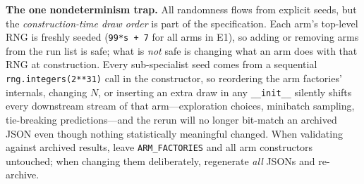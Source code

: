 \begin{warning}
\textbf{The one nondeterminism trap.} All randomness flows from explicit
seeds, but the \emph{construction-time draw order} is part of the
specification. Each arm's top-level RNG is freshly seeded
(\texttt{99*s + 7} for all arms in E1), so adding or removing arms from the
run list is safe; what is \emph{not} safe is changing what an arm does with
that RNG at construction. Every sub-specialist seed comes from a sequential
\texttt{rng.integers(2**31)} call in the constructor, so reordering the arm
factories' internals, changing $N$, or inserting an extra draw in any
\texttt{\_\_init\_\_} silently shifts every downstream stream of that
arm---exploration choices, minibatch sampling, tie-breaking
predictions---and the rerun will no longer bit-match an archived JSON even
though nothing statistically meaningful changed. When validating against
archived results, leave \texttt{ARM\_FACTORIES} and all arm constructors
untouched; when changing them deliberately, regenerate \emph{all} JSONs and
re-archive.
\end{warning}
